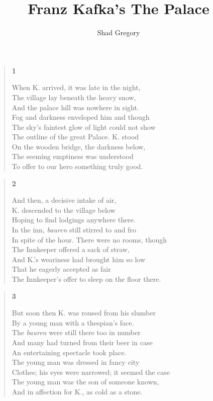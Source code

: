 \documentclass{article}
\title{Franz Kafka's The Palace}
\author{Shad Gregory}
\date{}
\begin{document}
\maketitle
\begin{verse}
  \begin{center}
    \textbf{1} \\
  \end{center}
  When K. arrived, it was late in the night, \\
  The village lay beneath the heavy snow, \\
  And the palace hill was nowhere in sight. \\
  Fog and darkness enveloped him and though \\
  The sky's faintest glow of light could not show \\
  The outline of the great Palace. K. stood \\
  On the wooden bridge, the darkness below, \\
  The seeming emptiness was understood \\
  To offer to our hero something truly good.
\end{verse}
\begin{verse}
  \begin{center}
    \textbf{2} \\
  \end{center}
  And then, a decisive intake of air, \\
  K. descended to the village below \\
  Hoping to find lodgings anywhere there. \\
  In the inn, \textit{bauren} still stirred to and fro \\
  In spite of the hour. There were no rooms, though \\
  The Innkeeper offered a sack of straw, \\
  And K.'s weariness had brought him so low \\
  That he eagerly accepted as fair \\
  The Innkeeper's offer to sleep on the floor there. \\
\end{verse}
\begin{verse}
  \begin{center}
    \textbf{3} \\
  \end{center}
  But soon then K. was roused from his slumber \\
  By a young man with a thespian's face. \\
  The \textit{bauren} were still there too in number \\
  And many had turned from their beer in case \\
  An entertaining spectacle took place. \\
  The young man was dressed in fancy city \\
  Clothes; his eyes were narrowed; it seemed the case \\
  The young man was the son of someone known, \\
  And in affection for K., as cold as a stone.
\end{verse}
\end{document}
